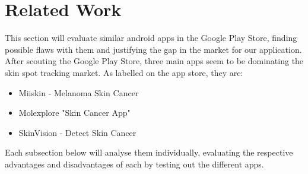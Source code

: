 \section{Related Work}
This section will evaluate similar android apps in the Google Play Store, finding possible flaws with them and justifying the gap in the market for our application. After scouting the Google Play Store, three main apps seem to be dominating the skin spot tracking market. As labelled on the app store, they are:
\begin{itemize}
    \item Miiskin - Melanoma Skin Cancer
    \item Molexplore "Skin Cancer App"
    \item SkinVision - Detect Skin Cancer
\end{itemize}
Each subsection below will analyse them individually, evaluating the respective advantages and disadvantages of each by testing out the different apps.
